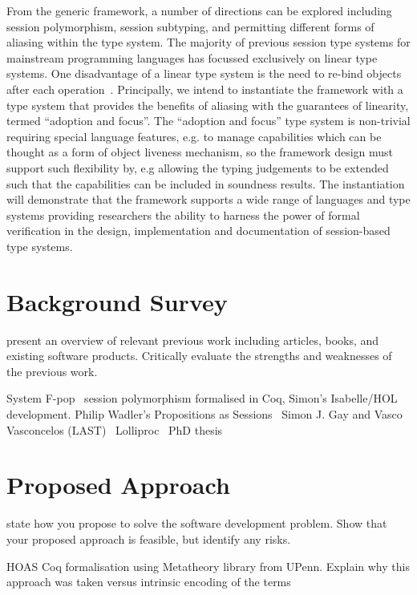 \documentclass{mprop}
\begin{document}
From the generic framework, a number of directions can be explored including
session polymorphism, session subtyping, and permitting different forms of
aliasing within the type system. The majority of previous session type systems
for mainstream programming languages has focussed exclusively on linear type
systems. One disadvantage of a linear type system is the need to re-bind
objects after each operation~\cite{Gay:2010:LAST}. Principally, we intend to
instantiate the framework with a type system that provides the benefits of
aliasing with the guarantees of linearity, termed ``adoption and focus''. The
``adoption and focus'' type system is non-trivial requiring special language
features, e.g. to manage capabilities which can be thought as a form of object
liveness mechanism, so the framework design must support such flexibility by,
e.g allowing the typing judgements to be extended such that the capabilities
can be included in soundness results. The instantiation will demonstrate that
the framework supports a wide range of languages and type systems providing
researchers the ability to harness the power of formal verification in the
design, implementation and documentation of session-based type systems.

\section{Background Survey}

present an overview of relevant previous work including articles, books, and
existing software products. Critically evaluate the strengths and weaknesses
of the previous work.

System F-pop~\cite{Mazurak:2010:LLT}
session polymorphism formalised in Coq, Simon's Isabelle/HOL
development.
Philip Wadler's Propositions as Sessions~\cite{Wadler:2012}
Simon J. Gay and Vasco Vasconcelos (LAST)~\cite{Gay:2010:LAST}
Lolliproc~\cite{Mazurak:2010:LCC}
PhD thesis~\cite{Mazurak:2013:LPP}

\section{Proposed Approach}

state how you propose to solve the software development problem. Show that
your proposed approach is feasible, but identify any risks.

HOAS Coq formalisation using Metatheory library from UPenn.
Explain why this approach was taken versus intrinsic encoding of the terms
\end{document}
